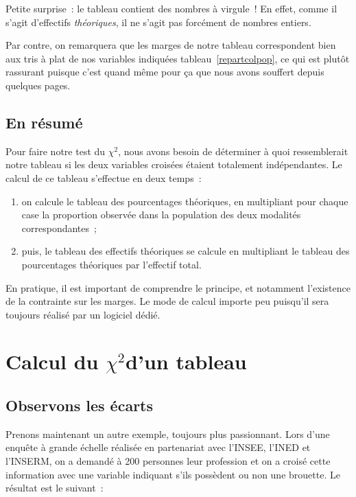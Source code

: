 \documentclass[a4paper,10pt,twoside,francais]{report}
\newcommand{\chid}{$\chi^2$\xspace}
\newcommand{\chidpdf}{\texorpdfstring{$\chi^2$\xspace}{X\texttwosuperior\xspace}}
\begin{document}
Petite surprise~: le tableau contient des nombres à virgule~! En
effet, comme il s'agit d'effectifs \textit{théoriques}, il ne s'agit
pas forcément de nombres entiers.

Par contre, on remarquera que les marges de notre tableau
correspondent bien aux tris à plat de nos variables indiquées
tableau~\ref{repartcolpop}, ce qui est plutôt rassurant puisque c'est
quand même pour ça que nous avons souffert depuis quelques pages.

\section{En résumé}

Pour faire notre test du \chid, nous avons besoin de déterminer à quoi
ressemblerait notre tableau si les deux variables croisées étaient
totalement indépendantes. Le calcul de ce tableau s'effectue en deux
temps~:

\begin{enumerate}
\item on calcule le tableau des pourcentages théoriques, en
  multipliant pour chaque case la proportion observée dans la
  population des deux modalités correspondantes~;
\item puis, le tableau des effectifs théoriques se calcule en multipliant le
tableau des pourcentages théoriques par l'effectif total.
\end{enumerate}


En pratique, il est important de comprendre le principe, et notamment
l'existence de la contrainte sur les marges. Le mode de calcul importe
peu puisqu'il sera toujours réalisé par un logiciel dédié.



\chapter{Calcul du \chidpdf d'un tableau}
\label{sec-calcchid}

\section{Observons les écarts}

Prenons maintenant un autre exemple, toujours plus passionnant. Lors
d'une enquête à grande échelle réalisée en partenariat avec l'INSEE,
l'INED et l'INSERM, on a demandé à 200 personnes leur profession et on
a croisé cette information avec une variable indiquant s'ils possèdent
ou non une brouette. Le résultat est le suivant~:
\end{document}
